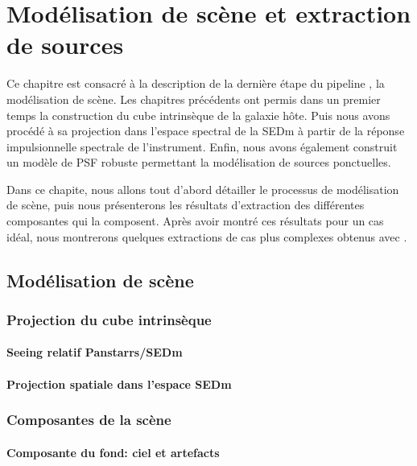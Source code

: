 \documentclass[../main/main.tex]{subfiles}
\begin{document}
\dominitoc
\faketableofcontents
\setcounter{chapter}{6}
\chapter{Modélisation de scène et extraction de sources}\label{ch:res}
\minitoc
\vspace{2cm}
Ce chapitre est consacré à la description de la dernière étape du pipeline \hypergal, la
modélisation de scène. Les chapitres précédents ont permis dans un
premier temps la
construction du cube intrinsèque de la galaxie hôte. Puis nous avons
procédé à sa projection dans
l'espace spectral de la SEDm à partir de la réponse impulsionnelle
spectrale de l'instrument. Enfin, nous avons également construit un modèle
de PSF robuste permettant la modélisation de sources ponctuelles.

Dans ce chapite, nous allons tout d'abord détailler le processus de
modélisation de scène, puis nous présenterons les résultats d'extraction des
différentes composantes qui la composent. Après avoir montré ces
résultats pour un cas idéal, nous montrerons quelques extractions de cas
plus complexes obtenus avec \hypergal.
\newpage

\section{Modélisation de scène}

\subsection{Projection du cube intrinsèque}

\subsubsection{Seeing relatif Panstarrs/SEDm}

\subsubsection{Projection spatiale dans l'espace SEDm}

\subsection{Composantes de la scène}

\subsubsection{Composante du fond: ciel et artefacts}
\end{document}
